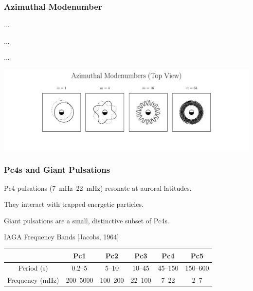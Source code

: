 \documentclass{beamer}
\begin{document}
\begin{frame}
\frametitle{Azimuthal Modenumber}

\begin{wideitemize}
\item ...
\item ...
\item ...
\end{wideitemize}

\vfill

\includegraphics[width=\textwidth]{figures/modenumber.pdf}

\end{frame}


\begin{frame}
\frametitle{Pc4s and Giant Pulsations}

\begin{wideitemize}
\item Pc4 pulsations (\SIrange{7}{22}{\mHz}) resonate at auroral latitudes. 
\item They interact with trapped energetic particles. 
\item Giant pulsations are a small, distinctive subset of Pc4s.  
\end{wideitemize}

\vfill

\begin{center}
IAGA Frequency Bands [Jacobs, 1964]
\begin{tabular}{ @{\extracolsep{\fill}} cccccc @{\extracolsep{\fill}} }
  \hline
  & Pc1 & Pc2 & Pc3 & Pc4 & Pc5 \\
  \hline
  Period (\si{\second}) & 0.2--5    & 5--10    & 10--45  & 45--150 & 150--600 \\
  Frequency (\si{\mHz}) & 200--5000 & 100--200 & 22--100 & 7--22   & 2--7     \\
  \hline
\end{tabular}
\end{center}

\end{frame}
\end{document}

